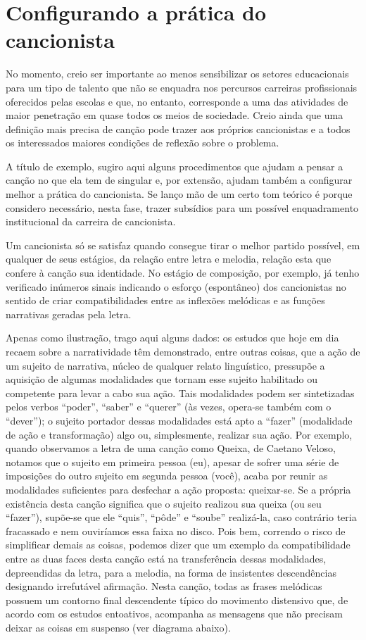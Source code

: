 \section{Configurando a prática do cancionista}

No momento, creio ser importante ao menos sensibilizar os setores
educacionais para um tipo de talento que não se enquadra nos percursos
carreiras profissionais oferecidos pelas escolas e que, no entanto,
corresponde a uma das atividades de maior penetração em quase todos os
meios de sociedade. Creio ainda que uma definição mais precisa de canção
pode trazer aos próprios cancionistas e a todos os interessados maiores
condições de reflexão sobre o problema.

A título de exemplo, sugiro aqui alguns procedimentos que ajudam a
pensar a canção no que ela tem de singular e, por extensão, ajudam
também a configurar melhor a prática do cancionista. Se lanço mão de um
certo tom teórico é porque considero necessário, nesta fase, trazer
subsídios para um possível enquadramento institucional da carreira de
cancionista.

Um cancionista só se satisfaz quando consegue tirar o melhor partido
possível, em qualquer de seus estágios, da relação entre letra e
melodia, relação esta que confere à canção sua identidade. No estágio de
composição, por exemplo, já tenho verificado inúmeros sinais indicando o
esforço (espontâneo) dos cancionistas no sentido de criar
compatibilidades entre as inflexões melódicas e as funções narrativas
geradas pela letra.

Apenas como ilustração, trago aqui alguns dados: os estudos que hoje em
dia recaem sobre a narratividade têm demonstrado, entre outras coisas,
que a ação de um sujeito de narrativa, núcleo de qualquer relato
linguístico, pressupõe a aquisição de algumas modalidades que tornam
esse sujeito habilitado ou competente para levar a cabo sua ação. Tais
modalidades podem ser sintetizadas pelos verbos ``poder'', ``saber'' e
``querer'' (às vezes, opera-se também com o ``dever''); o sujeito
portador dessas modalidades está apto a ``fazer'' (modalidade de ação e
transformação) algo ou, simplesmente, realizar sua ação. Por exemplo,
quando observamos a letra de uma canção como Queixa, de Caetano Veloso,
notamos que o sujeito em primeira pessoa (eu), apesar de sofrer uma
série de imposições do outro sujeito em segunda pessoa (você), acaba por
reunir as modalidades suficientes para desfechar a ação proposta:
queixar-se. Se a própria existência desta canção significa que o sujeito
realizou sua queixa (ou seu ``fazer''), supõe-se que ele ``quis'',
``pôde'' e ``soube'' realizá-la, caso contrário teria fracassado e nem
ouviríamos essa faixa no disco. Pois bem, correndo o risco de
simplificar demais as coisas, podemos dizer que um exemplo da
compatibilidade entre as duas faces desta canção está na transferência
dessas modalidades, depreendidas da letra, para a melodia, na forma de
insistentes descendências designando irrefutável afirmação. Nesta
canção, todas as frases melódicas possuem um contorno final descendente
típico do movimento distensivo que, de acordo com os estudos entoativos,
acompanha as mensagens que não precisam deixar as coisas em suspenso
(ver diagrama abaixo).

